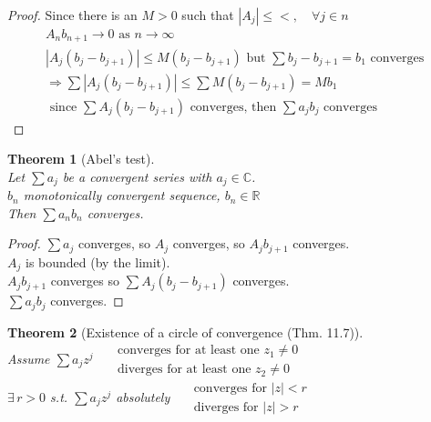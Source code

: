 \documentclass[twoside]{amsart}
\theoremstyle{plain}
\newtheorem{theorem}{Theorem}
\theoremstyle{definition}
\begin{document}
\begin{proof}
  Since there is an $M > 0 $ such that $|A_j| \leq <, \quad \forall j \in n$
\[
\begin{gathered}
  A_n b_{n+1} \to 0 \text{ as } n \to \infty \\
  | A_j (b_j - b_{j+1} ) | \leq M (b_j - b_{j+1} )  \text{ but } \sum b_j - b_{j+1} = b_1 \text{ converges } \\
  \Longrightarrow \sum | A_j (b_j - b_{j+1} ) | \leq \sum M (b_j - b_{j+1} ) = M b_1 \\
  \text{ since } \sum A_j (b_j - b_{j+1} ) \text{ converges, then $\sum a_j b_j$ converges } 
\end{gathered}
\]
\end{proof}

\begin{theorem}[Abel's test]\quad \\
Let $\sum a_j$ be a convergent series with $a_j \in \mathbb{C}$.  \\
\phantom{ Let } $b_n$ monotonically convergent sequence, $b_n \in \mathbb{R}$ \\
\phantom{Let b} Then $\sum a_n b_n$ converges.  
\end{theorem}

\begin{proof}
$\sum a_j$ converges, so $A_j$ converges, so $A_j b_{j+1}$ converges.  \\
$A_j$ is bounded (by the limit).  \\
$A_j b_{j+1}$ converges so $\sum A_j(b_j- b_{j+1})$ converges.  \\
  $\sum a_j b_j $ converges.  
\end{proof}

\begin{theorem}[Existence of a circle of convergence (Thm. 11.7)]  \quad \\
Assume $\sum a_j z^j$ $\begin{aligned}
  & \text{ converges for at least one $z_1 \neq 0 $ } \\
  & \text{ diverges for at least one $z_2 \neq 0 $ } 
\end{aligned}$  \bigskip \\
$\exists \, r > 0 $ s.t. $\sum a_j z^j$ absolutely $\begin{aligned} 
& \text{ converges for $|z| < r $ } \\
&  \text{ diverges for $|z| > r $ }
\end{aligned}$
\end{theorem}
\end{document}
